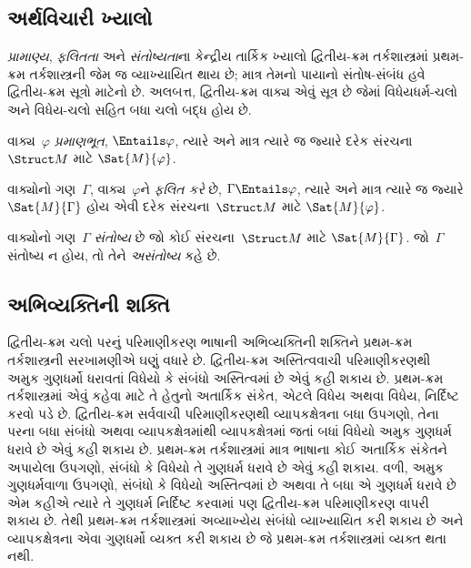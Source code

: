 \subsection{અર્થવિચારી ખ્યાલો}\label{sol:syn:sem:sec}

\begin{explain}
\emph{પ્રામાણ્ય}, \emph{ફલિતતા} અને \emph{સંતોષ્યતા}ના કેન્દ્રીય
તાર્કિક ખ્યાલો દ્વિતીય-ક્રમ તર્કશાસ્ત્રમાં પ્રથમ-ક્રમ તર્કશાસ્ત્રની
જેમ જ વ્યાખ્યાયિત થાય છે; માત્ર તેમનો પાયાનો સંતોષ-સંબંધ હવે
દ્વિતીય-ક્રમ સૂત્રો માટેનો છે. અલબત્ત, દ્વિતીય-ક્રમ
વાક્ય એવું સૂત્ર છે જેમાં વિધેયધર્મ-ચલો અને
વિધેય-ચલો સહિત બધા ચલો બદ્ધ હોય છે.
\end{explain}

\begin{defn}[પ્રામાણ્ય]
વાક્ય~$\varphi$ \emph{પ્રમાણભૂત}, $\Entails \varphi$, ત્યારે અને માત્ર ત્યારે જ
જ્યારે દરેક સંરચના~$\Struct M$ માટે $\Sat{M}{\varphi}$.
\end{defn}

\begin{defn}[ફલિતતા]
વાક્યોનો ગણ~$\Gamma$, વાક્ય~$\varphi$ને \emph{ફલિત કરે} છે,
$\Gamma \Entails \varphi$, ત્યારે અને માત્ર ત્યારે જ જ્યારે
$\Sat{M}{\Gamma}$ હોય એવી દરેક સંરચના~$\Struct M$ માટે
$\Sat{M}{\varphi}$.
\end{defn}

\begin{defn}[સંતોષ્યતા]
વાક્યોનો ગણ~$\Gamma$ \emph{સંતોષ્ય} છે જો કોઈ સંરચના~$\Struct M$
માટે $\Sat{M}{\Gamma}$. જો~$\Gamma$ સંતોષ્ય ન હોય, તો તેને
\emph{અસંતોષ્ય} કહે છે.
\end{defn}




\subsection{અભિવ્યક્તિની શક્તિ}\label{sol:syn:exp:sec}

\begin{explain}
દ્વિતીય-ક્રમ ચલો પરનું પરિમાણીકરણ ભાષાની અભિવ્યક્તિની શક્તિને
પ્રથમ-ક્રમ તર્કશાસ્ત્રની સરખામણીએ ઘણું વધારે છે. દ્વિતીય-ક્રમ
અસ્તિત્વવાચી પરિમાણીકરણથી અમુક ગુણધર્મો ધરાવતાં વિધેયો કે સંબંધો
અસ્તિત્વમાં છે એવું કહી શકાય છે. પ્રથમ-ક્રમ તર્કશાસ્ત્રમાં એવું કહેવા
માટે તે હેતુનો અતાર્કિક સંકેત, એટલે વિધેય અથવા વિધેય,
નિર્દિષ્ટ કરવો પડે છે. દ્વિતીય-ક્રમ સર્વવાચી પરિમાણીકરણથી વ્યાપકક્ષેત્રના
બધા ઉપગણો, તેના પરના બધા સંબંધો અથવા વ્યાપકક્ષેત્રમાંથી વ્યાપકક્ષેત્રમાં
જતાં બધાં વિધેયો અમુક ગુણધર્મ ધરાવે છે એવું કહી શકાય છે. પ્રથમ-ક્રમ
તર્કશાસ્ત્રમાં માત્ર ભાષાના કોઈ અતાર્કિક સંકેતને અપાયેલા ઉપગણો,
સંબંધો કે વિધેયો તે ગુણધર્મ ધરાવે છે એવું કહી શકાય. વળી,
અમુક ગુણધર્મવાળા ઉપગણો, સંબંધો કે વિધેયો અસ્તિત્વમાં છે અથવા તે બધા
એ ગુણધર્મ ધરાવે છે એમ કહીએ ત્યારે તે ગુણધર્મ નિર્દિષ્ટ કરવામાં પણ
દ્વિતીય-ક્રમ પરિમાણીકરણ વાપરી શકાય છે. તેથી પ્રથમ-ક્રમ તર્કશાસ્ત્રમાં
અવ્યાખ્યેય સંબંધો વ્યાખ્યાયિત કરી શકાય છે અને વ્યાપકક્ષેત્રના એવા
ગુણધર્મો વ્યક્ત કરી શકાય છે જે પ્રથમ-ક્રમ તર્કશાસ્ત્રમાં વ્યક્ત થતા
નથી.
\end{explain}

